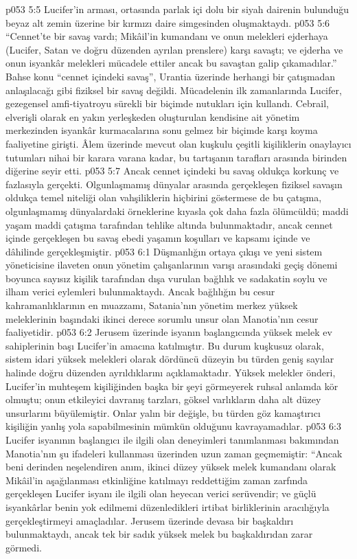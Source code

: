 \vs p053 5:5 Lucifer’in arması, ortasında parlak içi dolu bir siyah dairenin bulunduğu beyaz alt zemin üzerine bir kırmızı daire simgesinden oluşmaktaydı.
\vs p053 5:6 “Cennet’te bir savaş vardı; Mikâil’in kumandanı ve onun melekleri ejderhaya (Lucifer, Satan ve doğru düzenden ayrılan prenslere) karşı savaştı; ve ejderha ve onun isyankâr melekleri mücadele ettiler ancak bu savaştan galip çıkamadılar.” Bahse konu “cennet içindeki savaş”, Urantia üzerinde herhangi bir çatışmadan anlaşılacağı gibi fiziksel bir savaş değildi. Mücadelenin ilk zamanlarında Lucifer, gezegensel amfi\hyp{}tiyatroyu sürekli bir biçimde nutukları için kullandı. Cebrail, elverişli olarak en yakın yerleşkeden oluşturulan kendisine ait yönetim merkezinden isyankâr kurmacalarına sonu gelmez bir biçimde karşı koyma faaliyetine girişti. Âlem üzerinde mevcut olan kuşkulu çeşitli kişiliklerin onaylayıcı tutumları nihai bir karara varana kadar, bu tartışanın tarafları arasında birinden diğerine seyir etti.
\vs p053 5:7 Ancak cennet içindeki bu savaş oldukça korkunç ve fazlasıyla gerçekti. Olgunlaşmamış dünyalar arasında gerçekleşen fiziksel savaşın oldukça temel niteliği olan vahşiliklerin hiçbirini göstermese de bu çatışma, olgunlaşmamış dünyalardaki örneklerine kıyasla çok daha fazla ölümcüldü; maddi yaşam maddi çatışma tarafından tehlike altında bulunmaktadır, ancak cennet içinde gerçekleşen bu savaş ebedi yaşamın koşulları ve kapsamı içinde ve dâhilinde gerçekleşmiştir.
\vs p053 6:1 Düşmanlığın ortaya çıkışı ve yeni sistem yöneticisine ilaveten onun yönetim çalışanlarının varışı arasındaki geçiş dönemi boyunca sayısız kişilik tarafından dışa vurulan bağlılık ve sadakatin soylu ve ilham verici eylemleri bulunmaktaydı. Ancak bağlılığın bu cesur kahramanlıklarının en muazzamı, Satania’nın yönetim merkez yüksek meleklerinin başındaki ikinci derece sorumlu unsur olan Manotia’nın cesur faaliyetidir.
\vs p053 6:2 Jerusem üzerinde isyanın başlangıcında yüksek melek ev sahiplerinin başı Lucifer’in amacına katılmıştır. Bu durum kuşkusuz olarak, sistem idari yüksek melekleri olarak dördüncü düzeyin bu türden geniş sayılar halinde doğru düzenden ayrıldıklarını açıklamaktadır. Yüksek melekler önderi, Lucifer’in muhteşem kişiliğinden başka bir şeyi görmeyerek ruhsal anlamda kör olmuştu; onun etkileyici davranış tarzları, göksel varlıkların daha alt düzey unsurlarını büyülemiştir. Onlar yalın bir değişle, bu türden göz kamaştırıcı kişiliğin yanlış yola sapabilmesinin mümkün olduğunu kavrayamadılar.
\vs p053 6:3 Lucifer isyanının başlangıcı ile ilgili olan deneyimleri tanımlanması bakımından Manotia’nın şu ifadeleri kullanması üzerinden uzun zaman geçmemiştir: “Ancak beni derinden neşelendiren anım, ikinci düzey yüksek melek kumandanı olarak Mikâil’in aşağılanması etkinliğine katılmayı reddettiğim zaman zarfında gerçekleşen Lucifer isyanı ile ilgili olan heyecan verici serüvendir; ve güçlü isyankârlar benin yok edilmemi düzenledikleri irtibat birliklerinin aracılığıyla gerçekleştirmeyi amaçladılar. Jerusem üzerinde devasa bir başkaldırı bulunmaktaydı, ancak tek bir sadık yüksek melek bu başkaldırıdan zarar görmedi.
